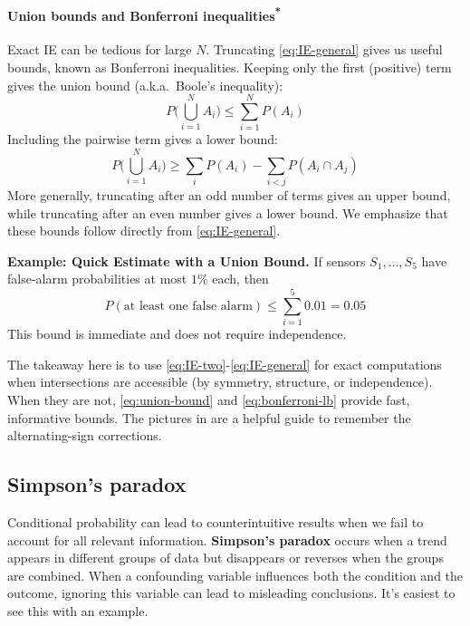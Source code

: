 \paragraph*{\texorpdfstring{Union bounds and Bonferroni inequalities\textsuperscript{*}}{Union bounds and Bonferroni inequalities}}
Exact IE can be tedious for large $N$. Truncating \autoref{eq:IE-general} gives us useful bounds, known as Bonferroni inequalities. Keeping only the first (positive) term gives the union bound (a.k.a.\ Boole's inequality):
\begin{equation}
    P\!\Big(\bigcup_{i=1}^N A_i\Big) \le \sum_{i=1}^N P(A_i)
    \label{eq:union-bound}
\end{equation}
Including the pairwise term gives a lower bound:
\begin{equation}
    P\!\Big(\bigcup_{i=1}^N A_i\Big) \ge \sum_i P(A_i) - \sum_{i<j} P(A_i\cap A_j)
    \label{eq:bonferroni-lb}
\end{equation}
More generally, truncating after an odd number of terms gives an upper bound, while truncating after an even number gives a lower bound. We emphasize that these bounds follow directly from \autoref{eq:IE-general}.

\begin{exampleBox}
\textbf{Example: Quick Estimate with a Union Bound.}
If sensors $S_1,\dots,S_5$ have false-alarm probabilities at most $1\%$ each, then
\begin{equation}
    P(\text{at least one false alarm}) \le \sum_{i=1}^5 0.01 = 0.05
\end{equation}
This bound is immediate and does not require independence.
\end{exampleBox}
The takeaway here is to use \autoref{eq:IE-two}-\autoref{eq:IE-general} for exact computations when intersections are accessible (by symmetry, structure, or independence). When they are not, \autoref{eq:union-bound} and \autoref{eq:bonferroni-lb} provide fast, informative bounds. The pictures in  are a helpful guide to remember the alternating-sign corrections.


\subsection{Simpson's paradox}
Conditional probability can lead to counterintuitive results when we fail to account for all relevant information. \textbf{Simpson's paradox} occurs when a trend appears in different groups of data but disappears or reverses when the groups are combined. When a confounding variable influences both the condition and the outcome, ignoring this variable can lead to misleading conclusions. It's easiest to see this with an example.

